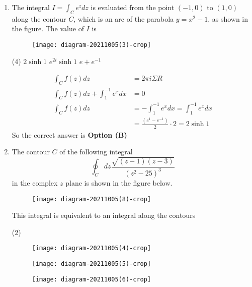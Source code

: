 \begin{note}
\begin{enumerate}[label=\color{ocre}\textbf{\arabic*.}]
	\item The integral $I=\int_{C} e^{z} d z$ is evaluated from the point $(-1,0)$ to $(1,0)$ along the contour $C$, which is an arc of the parabola $y=x^{2}-1$, as shown in the figure. The value of $I$ is
	{}
	\begin{figure}[H]
		\centering
		\texttt{[image: diagram-20211005(3)-crop]}
	\end{figure}
	\begin{tasks}(4)
		\task[\textbf{B.}] $2 \sinh 1$
		\task[\textbf{C.}]  $e^{2 i} \sinh 1$
		\task[\textbf{D.}] $e+e^{-1}$
	\end{tasks}
	\begin{answer}
		\begin{align*}
		\int_{C} f(z) d z&=2 \pi i \Sigma R\\
		\int_{C} f(z) d z+\int_{1}^{-1} e^{x} d x&=0\\
		\int_{C} f(z) d z&=-\int_{1}^{-1} e^{x} d x=\int_{1}^{-1} e^{x} d x\\&=\frac{\left(e^{1}-e^{-1}\right)}{2} \cdot 2=2 \sinh 1
		\end{align*}
		So the correct answer is \textbf{Option (B)}
	\end{answer}
	\item The contour $C$ of the following integral
	$$
	\oint_{C} d z \frac{\sqrt{(z-1)(z-3)}}{\left(z^{2}-25\right)^{3}}
	$$
	in the complex $z$ plane is shown in the figure below.\\
	\begin{figure}[H]
		\centering
		\texttt{[image: diagram-20211005(8)-crop]}
	\end{figure}
	This integral is equivalent to an integral along the contours
	{}
	\begin{tasks}(2)
		\task[\textbf{A.}] \begin{figure}[H]
			\centering
			\texttt{[image: diagram-20211005(4)-crop]}
		\end{figure}
		\task[\textbf{B.}] \begin{figure}[H]
			\centering
			\texttt{[image: diagram-20211005(5)-crop]}
		\end{figure}
		\task[\textbf{C.}] \begin{figure}[H]
			\centering
			\texttt{[image: diagram-20211005(6)-crop]}
		\end{figure}
		\task[\textbf{D.}] \begin{figure}[H]

\end{figure}
\end{tasks}
\end{enumerate}
\end{note}
